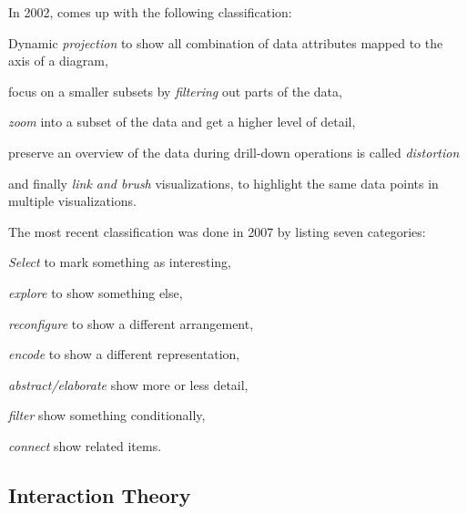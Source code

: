 \documentclass{article}
\begin{document}
In 2002, \textcite{Keim2002} comes up with the following classification:
\begin{enumerate*}[label=(\arabic*)]
  \item
    Dynamic \emph{projection} to show all combination of data attributes mapped to the axis of a diagram,
  \item
    focus on a smaller subsets by \emph{filtering} out parts of the data,
  \item
    \emph{zoom} into a subset of the data and get a higher level of detail,
  \item
    preserve an overview of the data during drill-down operations is called \emph{distortion}
  \item
    and finally \emph{link and brush} visualizations, to highlight the same data points in multiple visualizations.
\end{enumerate*}

The most recent classification was done in 2007 by \textcite{Yi2007} listing seven categories:
\begin{enumerate*}[label=(\arabic*)]
  \item
    \emph{Select} to mark something as interesting,
  \item
    \emph{explore} to show something else,
  \item
    \emph{reconfigure} to show a different arrangement,
  \item
    \emph{encode} to show a different representation,
  \item
    \emph{abstract/elaborate} show more or less detail,
  \item
    \emph{filter} show something conditionally,
  \item
    \emph{connect} show related items.
\end{enumerate*}


\subsection{Interaction Theory}
\end{document}
